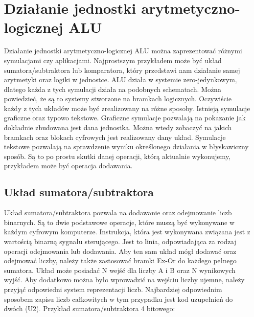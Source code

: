 \documentclass[12pt, a4paper, onside, polish]{article}				%
\begin{document}
\cleardoublepage





\section{Działanie jednostki arytmetyczno-logicznej ALU}
\hspace{\parindent}
Działanie jednostki arytmetyczno-logicznej ALU można zaprezentować różnymi symulacjami czy aplikacjami. Najprostszym przykładem może być układ sumatora/subtraktora lub komparatora, który przedstawi nam działanie samej arytmetyki oraz logiki w jednostce. ALU działa w systemie zero-jedynkowym, dlatego każda z tych symulacji działa na podobnych schematach. Można powiedzieć, że są to systemy stworzone na bramkach logicznych. Oczywiście każdy z tych układów może być zrealizowany na różne sposoby. Istnieją symulacje graficzne oraz typowo tekstowe. 
	 Graficzne symulacje pozwalają na pokazanie jak dokładnie zbudowana jest dana jednostka. Można wtedy zobaczyć na jakich bramkach oraz blokach cyfrowych jest realizowany dany układ.  
	Symulacje tekstowe pozwalają na sprawdzenie wyniku określonego działania w błyskawiczny sposób. Są to po prostu skutki danej operacji, którą aktualnie wykonujemy, przykładem może być operacja dodawania.  
	

\subsection{Układ sumatora/subtraktora}
\hspace{\parindent}
Układ sumatora/subtraktora pozwala na dodawanie oraz odejmowanie liczb binarnych. Są to dwie podstawowe operacje, które muszą być wykonywane w każdym cyfrowym komputerze. Instrukcja, która jest wykonywana związana jest z wartością binarną sygnału sterującego. Jest to linia, odpowiadająca za rodzaj operacji odejmowania lub dodawania. Aby ten sam układ mógł dodawać oraz odejmować liczby, należy także zastosować bramki Ex-Or do każdego pełnego sumatora. Układ może posiadać N wejść dla liczby A i B oraz N wynikowych wyjść. Aby dodatkowo można było wprowadzić na wejściu liczby ujemne, należy przyjąć odpowiedni system reprezentacji liczb. Najbardziej odpowiednim sposobem zapisu liczb całkowitych w tym przypadku jest kod uzupełnień do dwóch (U2).
\cleardoublepage
Przykład sumatora/subtraktora 4 bitowego:
\end{document}
